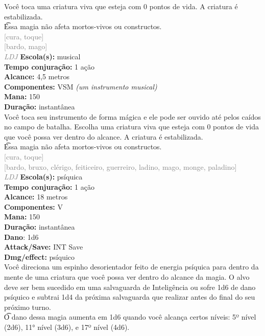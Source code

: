 \documentclass{RPG_Adventure}[2021/10/20]
\begin{document}
{\normalsize Você toca uma criatura viva que esteja com 0 pontos de vida. A criatura é estabilizada.\\\t Essa magia não afeta mortos-vivos ou constructos.\\}
{\scriptsize \textcolor{gray}{[cura, toque]\\}}
{\scriptsize \textcolor{gray}{[bardo, mago]\\}}
{\tiny \textcolor{gray}{\textit{LDJ}}}
{\small \t \textbf{Escola(s):} musical\\\t \textbf{Tempo conjuração:} 1 ação\\\t \textbf{Alcance:} 4,5 metros\\\t \textbf{Componentes:} VSM \textit{(um instrumento musical)}\\\t \textbf{Mana:} 150\\\t \textbf{Duração:} instantânea\\}
{\normalsize Você toca seu instrumento de forma mágica e ele pode ser ouvido até pelos caídos no campo de batalha. Escolha uma criatura viva que esteja com 0 pontos de vida que você possa ver dentro do alcance. A criatura é estabilizada.\\\t Essa magia não afeta mortos-vivos ou constructos.\\}
{\scriptsize \textcolor{gray}{[cura, toque]\\}}
{\scriptsize \textcolor{gray}{[bardo, bruxo, clérigo, feiticeiro, guerreiro, ladino, mago, monge, paladino]\\}}
{\tiny \textcolor{gray}{\textit{LDJ}}}
{\small \t \textbf{Escola(s):} psíquica\\\t \textbf{Tempo conjuração:} 1 ação\\\t \textbf{Alcance:} 18 metros\\\t \textbf{Componentes:} V\\\t \textbf{Mana:} 150\\\t \textbf{Duração:} instantânea\\\t \textbf{Dano}: 1d6\\\t \textbf{Attack/Save:} INT Save\\\t \textbf{Dmg/effect:} psíquico\\}
{\normalsize Você direciona um espinho desorientador feito de energia psíquica para dentro da mente de uma criatura que você possa ver dentro do alcance da magia. O alvo deve ser bem sucedido em uma salvaguarda de Inteligência ou sofre 1d6 de dano psíquico e subtrai 1d4 da próxima salvaguarda que realizar antes do final do seu próximo turno.\\\t O dano dessa magia aumenta em 1d6 quando você alcança certos níveis: 5º nível (2d6), 11° nível (3d6), e 17º nível (4d6).\\}
\end{document}
